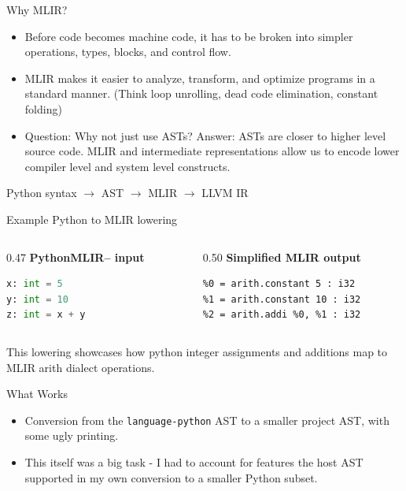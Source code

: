 \documentclass[aspectratio=169,11pt]{beamer}
\begin{document}
\begin{frame}{Why MLIR?}
	\begin{itemize}
		\item Before code becomes machine code, it has to be broken into simpler operations,
		      types, blocks, and control flow.
		\item MLIR makes it easier to analyze, transform, and optimize programs in a standard
		      manner. (Think loop unrolling, dead code elimination, constant folding)
		\item Question: Why not just use ASTs? Answer: ASTs are closer to higher level source
		      code. MLIR and intermediate representations allow us to encode lower compiler
		      level and system level constructs.
	\end{itemize}

	\vspace{0.35cm}
	\centering
	\Large
	Python syntax $\rightarrow$ AST $\rightarrow$ MLIR $\rightarrow$ LLVM IR
\end{frame}
\begin{frame}[fragile]{Example Python to MLIR lowering}
	\begin{columns}[T,onlytextwidth]
		\begin{column}{0.47\textwidth}
			\textbf{PythonMLIR-- input}
			\begin{lstlisting}[language=Python]
x: int = 5
y: int = 10
z: int = x + y
      \end{lstlisting}
		\end{column}
		\begin{column}{0.50\textwidth}
			\textbf{Simplified MLIR output}
			\begin{lstlisting}
%0 = arith.constant 5 : i32
%1 = arith.constant 10 : i32
%2 = arith.addi %0, %1 : i32
      \end{lstlisting}
		\end{column}
	\end{columns}

	\vspace{0.35cm}
	This lowering showcases how python integer assignments and additions map to MLIR arith dialect operations.
\end{frame}

\begin{frame}{What Works}
	\begin{itemize}
		\item Conversion from the \texttt{language-python} AST to a smaller project AST, with
		      some ugly printing.
		\item This itself was a big task - I had to account for features the host AST
		      supported in my own conversion to a smaller Python subset.
	\end{itemize}
\end{frame}
\end{document}
